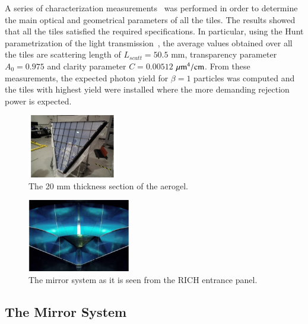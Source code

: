 \documentclass[final,5p,times,twocolumn]{elsarticle}
\begin{document}
A series of characterization measurements~\cite{RICH:RICH2016mc} was performed in order to determine the main optical and geometrical 
parameters of all the tiles. The results showed that all the tiles satisfied the required specifications. In particular, using the 
Hunt parametrization of the light transmission~\cite{Hunt}, the average values obtained over all the tiles are scattering length of 
$L_{scatt} = 50.5$ mm, transparency parameter $A_0 = 0.975$ and clarity parameter $C = 0.00512$ $\rm \mu m^4 / cm$. From these measurements, 
the expected photon yield for $\beta=1$ particles was computed and the tiles with highest yield were installed where the more demanding 
rejection power is expected.  

\begin{figure}
\begin{center}
\includegraphics[width=0.35\textwidth]{EPS/aerogel_bottom.pdf}
\caption{The 20 mm thickness section of the aerogel.}
\label{Fig:AeroB1}
\end{center}
\end{figure}

\begin{figure}
\begin{center}
\includegraphics[width=0.4\textwidth]{EPS/mirrors.pdf}
\caption{The mirror system as it is seen from the RICH entrance panel.}
\label{fig:mirrors}
\end{center}
\end{figure}

\subsection{The Mirror System}
\end{document}
